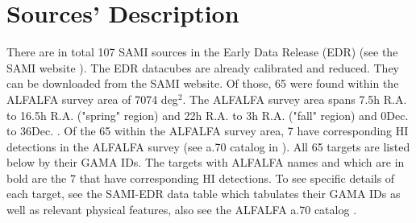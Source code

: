 \documentclass[10pt,letterpaper]{article}
\begin{document}
\section{Sources' Description}
\label{sec:sources}
There are in total 107 SAMI sources in the Early Data Release (EDR) (see the SAMI website \cite{SAMI instrument front-page}). The EDR datacubes are already calibrated and reduced. They can be downloaded from the SAMI website. Of those, 65 were found within the ALFALFA survey area of 7074 deg$^2$. The ALFALFA survey area spans 7.5h R.A. to 16.5h R.A. ("spring" region) and 22h R.A. to 3h R.A. ("fall" region) and 0\degree Dec. to 36\degree Dec. \cite{mass function}. Of the 65 within the ALFALFA survey area, 7 have corresponding HI detections in the ALFALFA survey (see a.70 catalog in \cite{alfalfa data}). All 65 targets are listed below by their GAMA IDs. The targets with ALFALFA names and which are in bold are the 7 that have corresponding HI detections. To see specific details of each target, see the SAMI-EDR data table \cite{SAMI Early Data Release} which tabulates their GAMA IDs as well as relevant physical features, also see the ALFALFA a.70 catalog \cite{alfalfa data}. \\
\end{document}
